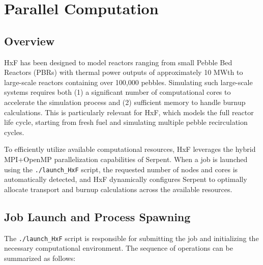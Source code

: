 \documentclass{article}
\begin{document}
\newpage
\section{Parallel Computation}

\subsection{Overview}

HxF has been designed to model reactors ranging from small Pebble Bed Reactors (PBRs) with thermal power outputs of approximately 10 MWth to large-scale reactors containing over 100,000 pebbles. Simulating such large-scale systems requires both (1) a significant number of computational cores to accelerate the simulation process and (2) sufficient memory to handle burnup calculations. This is particularly relevant for HxF, which models the full reactor life cycle, starting from fresh fuel and simulating multiple pebble recirculation cycles.

To efficiently utilize available computational resources, HxF leverages the hybrid MPI+OpenMP parallelization capabilities of Serpent. When a job is launched using the \texttt{./launch\_HxF} script, the requested number of nodes and cores is automatically detected, and HxF dynamically configures Serpent to optimally allocate transport and burnup calculations across the available resources.

\subsection{Job Launch and Process Spawning}

The \texttt{./launch\_HxF} script is responsible for submitting the job and initializing the necessary computational environment. The sequence of operations can be summarized as follows:
\end{document}
